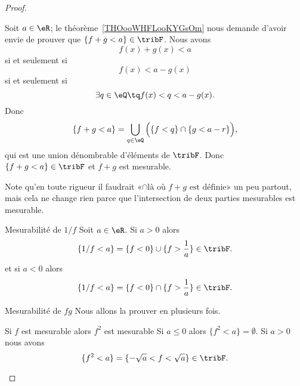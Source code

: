 \begin{proof}
\begin{subproof}
        Soit \( a\in \eR\); le théorème~\ref{THOooWHFLooKYGsOm} nous demande d'avoir envie de prouver que \(  \{ f+g <a\} \in \tribF \). Nous avons
        \begin{equation}
            f(x)+g(x)<a
        \end{equation}
        si et seulement si
        \begin{equation}
            f(x)<a-g(x)
        \end{equation}
        si et seulement si
        \begin{equation}
            \exists q\in \eQ\tq f(x)<q<a-g(x).
        \end{equation}
        Donc
        \begin{equation}
            \{ f+g<a \}=\bigcup_{q\in \eQ}\Big( \{ f<q \}\cap\{ g<a-r \} \Big),
        \end{equation}
        qui est une union dénombrable d'éléments de \( \tribF\). Donc \( \{ f+g<a \}\in \tribF\) et \( f+g\) est mesurable.

        Note qu'en toute rigueur il faudrait  «\( \cap\text{là où } f+g\text{ est définie}\)» un peu partout, mais cela ne change rien parce que l'intersection de deux parties mesurables est mesurable.
    \item[Mesurabilité de \( 1/f\)]
        Soit \( a\in \eR\). Si \( a>0\) alors
        \begin{equation}
            \{ 1/f<a \}=\{ f<0 \}\cup\{ f>\frac{1}{ a } \}\in\tribF.
        \end{equation}
        et si \( a<0\) alors
        \begin{equation}
            \{ 1/f<a \}=\{ f<0 \}\cap\{ f>\frac{1}{ a } \}\in\tribF.
        \end{equation}
    \item[Mesurabilité de \( fg\)]
        Nous allons la prouver en plusieurs fois.
        \begin{subproof}
        \item[Si \( f\) est mesurable alors \( f^2\) est mesurable]
            Si \( a\leq 0\) alors \( \{ f^2<a \}=\emptyset\). Si \( a>0\) nous avons
            \begin{equation}
                 \{ f^2<a \}=\{ -\sqrt{a}<f<\sqrt{a} \}\in\tribF.
            \end{equation}


\end{subproof}
\end{subproof}
\end{proof}
